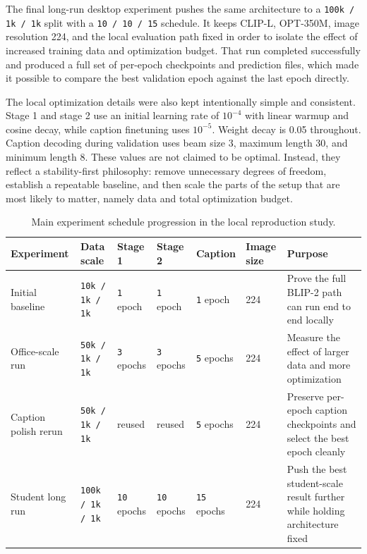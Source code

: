 \documentclass[11pt]{article}
\begin{document}
The final long-run desktop experiment pushes the same architecture to a \texttt{100k / 1k / 1k} split with a \texttt{10 / 10 / 15} schedule. It keeps CLIP-L, OPT-350M, image resolution 224, and the local evaluation path fixed in order to isolate the effect of increased training data and optimization budget. That run completed successfully and produced a full set of per-epoch checkpoints and prediction files, which made it possible to compare the best validation epoch against the last epoch directly.

The local optimization details were also kept intentionally simple and consistent. Stage 1 and stage 2 use an initial learning rate of $10^{-4}$ with linear warmup and cosine decay, while caption finetuning uses $10^{-5}$. Weight decay is 0.05 throughout. Caption decoding during validation uses beam size 3, maximum length 30, and minimum length 8. These values are not claimed to be optimal. Instead, they reflect a stability-first philosophy: remove unnecessary degrees of freedom, establish a repeatable baseline, and then scale the parts of the setup that are most likely to matter, namely data and total optimization budget.

\begin{table}[t]
\centering
\small
\begin{tabularx}{\textwidth}{p{2.6cm} p{1.7cm} p{1.7cm} p{1.9cm} p{1.6cm} p{1.8cm} Y}
\toprule
Experiment & Data scale & Stage 1 & Stage 2 & Caption & Image size & Purpose \\
\midrule
Initial baseline & \texttt{10k / 1k / 1k} & \texttt{1} epoch & \texttt{1} epoch & \texttt{1} epoch & 224 & Prove the full BLIP-2 path can run end to end locally \\
Office-scale run & \texttt{50k / 1k / 1k} & \texttt{3} epochs & \texttt{3} epochs & \texttt{5} epochs & 224 & Measure the effect of larger data and more optimization \\
Caption polish rerun & \texttt{50k / 1k / 1k} & reused & reused & \texttt{5} epochs & 224 & Preserve per-epoch caption checkpoints and select the best epoch cleanly \\
Student long run & \texttt{100k / 1k / 1k} & \texttt{10} epochs & \texttt{10} epochs & \texttt{15} epochs & 224 & Push the best student-scale result further while holding architecture fixed \\
\bottomrule
\end{tabularx}
\caption{Main experiment schedule progression in the local reproduction study.}
\label{tab:experiment-schedule}
\end{table}
\end{document}
